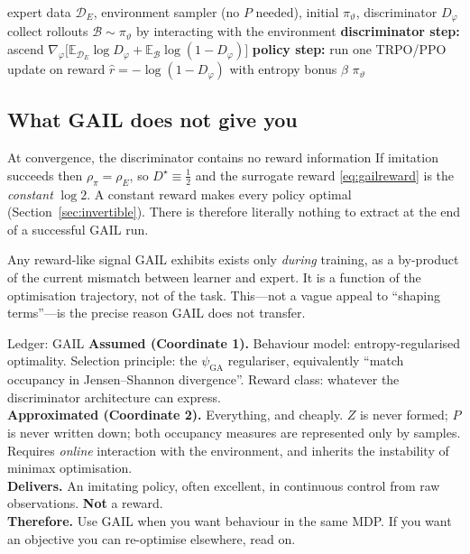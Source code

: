 \documentclass[11pt]{article}
\theoremstyle{plain}
\theoremstyle{definition}
\theoremstyle{remark}
\newcommand{\E}{\mathbb{E}}
\newcommand{\GA}{\mathrm{GA}}
\begin{document}
\begin{algorithm}[H]
\caption{GAIL (Ho \& Ermon, 2016)}
\begin{algorithmic}[1]
\Require expert data $\mathcal{D}_E$, environment sampler (no $P$
needed), initial $\pi_\vartheta$, discriminator $D_\varphi$
  \State collect rollouts $\mathcal{B}\sim\pi_\vartheta$ by interacting
  with the environment
  \State \textbf{discriminator step:} ascend $\nabla_\varphi\big[
  \E_{\mathcal{D}_E}\log D_\varphi + \E_{\mathcal{B}}\log(1-D_\varphi)\big]$
  \State \textbf{policy step:} run one TRPO/PPO update on reward $\hat r =
  -\log(1-D_\varphi)$ with entropy bonus $\beta$
\EndFor
\State \Return $\pi_\vartheta$
\end{algorithmic}
\label{alg:gail}
\end{algorithm}

\subsection{What GAIL does not give you}

\begin{redbox}{At convergence, the discriminator contains no reward
information}
If imitation succeeds then $\rho_\pi=\rho_E$, so $D^\star\equiv\frac12$ and
the surrogate reward \eqref{eq:gailreward} is the \emph{constant} $\log2$.
A constant reward makes every policy optimal
(Section~\ref{sec:invertible}). There is therefore literally nothing to
extract at the end of a successful GAIL run.

Any reward-like signal GAIL exhibits exists only \emph{during} training,
as a by-product of the current mismatch between learner and expert. It is
a function of the optimisation trajectory, not of the task.
This---not a vague appeal to ``shaping terms''---is the precise reason
GAIL does not transfer.
\end{redbox}

\begin{navybox}{Ledger: GAIL}
\textbf{Assumed (Coordinate 1).} Behaviour model: entropy-regularised
optimality. Selection principle: the $\psi_\GA$ regulariser, equivalently
``match occupancy in Jensen--Shannon divergence''. Reward class: whatever
the discriminator architecture can express.\\
\textbf{Approximated (Coordinate 2).} Everything, and cheaply. $Z$ is
never formed; $P$ is never written down; both occupancy measures are
represented only by samples. Requires \emph{online} interaction with the
environment, and inherits the instability of minimax optimisation.\\
\textbf{Delivers.} An imitating policy, often excellent, in continuous
control from raw observations. \textbf{Not} a reward.\\
\textbf{Therefore.} Use GAIL when you want behaviour in the same MDP. If
you want an objective you can re-optimise elsewhere, read on.
\end{navybox}
\end{document}
